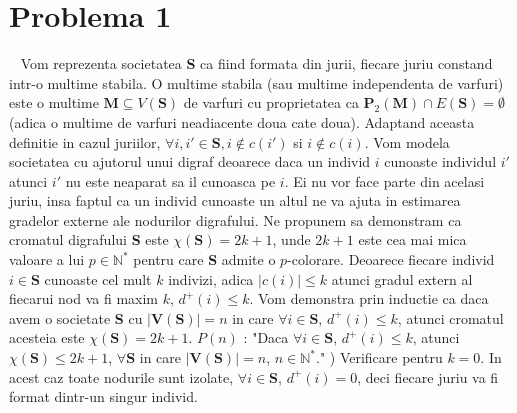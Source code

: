 \documentclass{article}
\begin{document}
\section{Problema 1}
\  
\newline
\newline
	Vom reprezenta societatea \textbf{S} ca fiind formata din jurii, fiecare juriu constand intr-o multime stabila.
\newline
	O multime stabila (sau multime independenta de varfuri) este o multime $\textbf{M} \subseteq V(\textbf{S})$ de varfuri cu proprietatea ca $\textbf{P}_2 (\textbf{M})\cap E(\textbf{S}) =\emptyset$ (adica o multime de varfuri neadiacente doua cate doua). Adaptand aceasta definitie in cazul juriilor, $\forall i,i' \in \textbf{S}, i \not \in c(i')$ si $i \not \in c(i)$.
\newline
\newline
    Vom modela societatea cu ajutorul unui digraf deoarece daca un individ $i$ cunoaste individul $i'$ atunci $i'$ nu este neaparat sa il cunoasca pe $i$. Ei nu vor face parte din acelasi juriu, insa faptul ca un individ cunoaste un altul ne va ajuta in estimarea gradelor externe ale nodurilor digrafului. 
\newline  
\newline  
    Ne propunem sa demonstram ca cromatul digrafului \textbf{S}  este $\chi(\textbf{S})=2k+1$, unde $2k+1$ este cea mai mica valoare a lui  $p \in \mathbb{N}^* $ pentru care \textbf{S} admite o $p$-colorare.
    \newline
    Deoarece fiecare individ $i \in \textbf{S}$ cunoaste cel mult $k$ indivizi, adica $|c(i)|\leq k $ atunci gradul extern al fiecarui nod va fi maxim $k$, $d^+ (i) \leq k$.
    \newline
    \newline
    Vom demonstra prin inductie ca daca avem o societate \textbf{S} cu $|\textbf{V}(\textbf{S})|=n$ in care $\forall i \in \textbf{S}$, $d^+ (i) \leq k$, atunci cromatul acesteia este $\chi(\textbf{S})=2k+1$.
    \newline
    \newline
    $P(n)$ : "Daca $\forall i \in \textbf{S}$, $d^+ (i) \leq k$, atunci $\chi(\textbf{S}) \leq 2k+1$, $\forall \textbf{S}$ in care $|\textbf{V}(\textbf{S})|=n$, $n \in \mathbb{N}^*$."
    \newline
    ) Verificare pentru $k=0$. 
    \newline
    In acest caz toate nodurile sunt izolate, $\forall i \in \textbf{S}$, $d^+ (i)=0$, deci fiecare juriu va fi format dintr-un singur individ.
\end{document}
